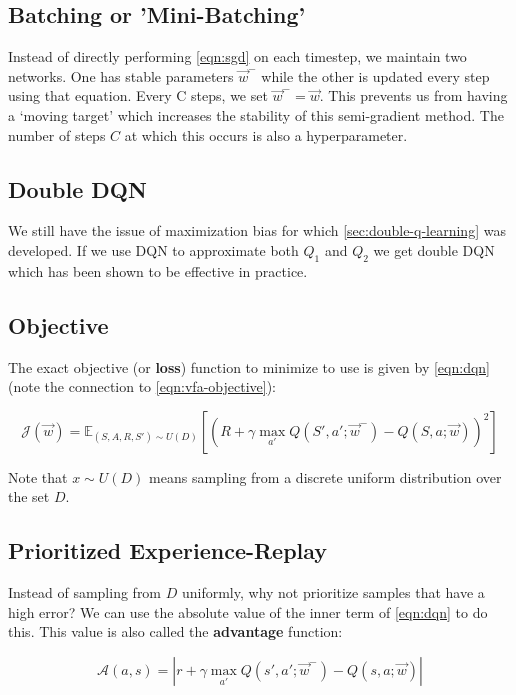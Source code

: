 \documentclass[11pt]{report}
\begin{document}
\subsection{Batching or 'Mini-Batching'}
Instead of directly performing \autoref{eqn:sgd} on each timestep, we maintain two networks. One has stable parameters $\vec{w}^-$ while the other is updated every step using that equation. Every C steps, we set $\vec{w}^- = \vec{w}$. This prevents us from having a `moving target' which increases the stability of this semi-gradient method. The number of steps $C$ at which this occurs is also a hyperparameter.

\subsection{Double DQN}

We still have the issue of maximization bias for which \autoref{sec:double-q-learning} was developed. If we use DQN to approximate both $Q_1$ and $Q_2$ we get double DQN which has been shown to be effective in practice.

\subsection{Objective}

The exact objective (or \textbf{loss}) function to minimize to use is given by \autoref{eqn:dqn} (note the connection to \autoref{eqn:vfa-objective}):

\begin{equation}
	\label{eqn:dqn}
	\mathcal{J}(\vec{w}) = \mathbb{E}_{(S, A, R, S') \sim U(D)}	\left[ \left(R + \gamma \max_{a'} Q(S', a'; \vec{w}^- ) - Q(S, a; \vec{w})\right)^2 \right]
\end{equation}

Note that $x \sim U(D)$ means sampling from a discrete uniform distribution over the set $D$.

\subsection{Prioritized Experience-Replay}
Instead of sampling from $D$ uniformly, why not prioritize samples that have a high error? We can use the absolute value of the inner term of \autoref{eqn:dqn} to do this. This value is also called the \textbf{advantage} function:

\begin{equation}
	\label{eqn:dqn-advantage}
	\mathcal{A}(a, s) = |r + \gamma\max_{a'}Q(s',a';\vec{w}^-) - Q(s,a;\vec{w})|
\end{equation}
\end{document}
